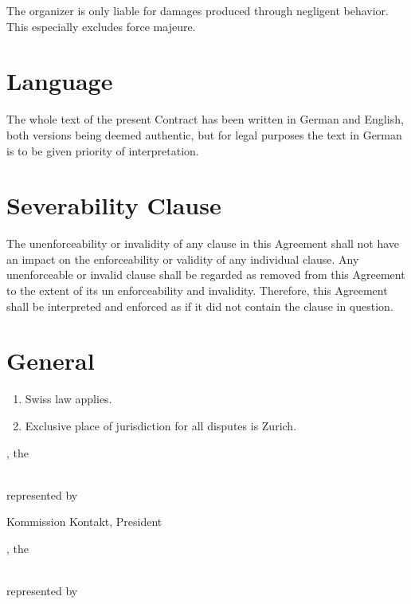 The organizer is only liable for damages produced through negligent behavior. This especially excludes force majeure.


\section{Language}

The whole text of the present Contract has been written in German and English, 
both versions being deemed authentic, but for legal purposes the text in German 
is to be given priority of interpretation.

\section{Severability Clause}

The unenforceability or invalidity of any clause in this Agreement shall not 
have an
impact on the enforceability or validity of any individual clause. Any unenforceable
or invalid clause shall be regarded as removed from this Agreement to the extent of its
un enforceability and invalidity. Therefore, this Agreement shall be interpreted and
enforced as if it did not contain the clause in question.

\section{General}
\begin{enumerate}
\item Swiss law applies.
\item Exclusive place of jurisdiction for all disputes is Zurich.
\end{enumerate}

\vfill
\noindent
\begin{minipage}[t]{0.45\textwidth}
\amivcity, the \hrulefill

\bigskip\noindent
\amivname\\
represented by

\vspace{4em}
\hrulefill

\amivkontaktpresident

Kommission Kontakt, President
\end{minipage}%
\hspace{0.1\textwidth}
\begin{minipage}[t]{0.45\textwidth}
\makebox[8em]{\hrulefill}, the \hrulefill

\bigskip\noindent
\companyname\\
represented by

\vspace{4em}
\hrulefill

\companycontact\vphantom{Ensure correct height.}\\

\end{minipage}
